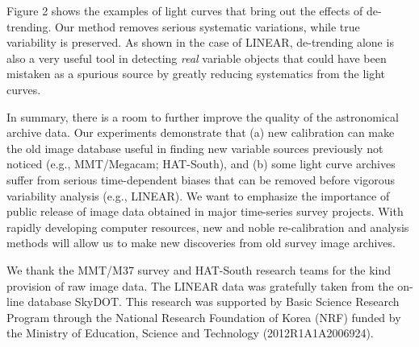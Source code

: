 \noindent Figure 2 shows the examples of light curves that bring out the effects of de-trending.  Our method removes serious systematic variations, while true variability is preserved.  As shown in the case of LINEAR, de-trending alone is also a very useful tool in detecting {\itshape real} variable objects that could have been mistaken as a spurious source by greatly reducing systematics from the light curves.

In summary, there is a room to further improve the quality of the astronomical archive data.  Our experiments demonstrate that (a) new calibration can make the old image database useful in finding new variable sources previously not noticed (e.g., MMT/Megacam; HAT-South), and (b) some light curve archives suffer from serious time-dependent biases that can be removed before vigorous variability analysis (e.g., LINEAR).  We want to emphasize the importance of public release of image data obtained in major time-series survey projects.  With rapidly developing computer resources, new and noble re-calibration and analysis methods will allow us to make new discoveries from old survey image archives.  

\acknowledgements We thank the MMT/M37 survey and HAT-South research teams for the kind provision of raw image data.  The LINEAR data was gratefully taken from the on-line database SkyDOT.  This research was supported by Basic Science Research Program through the National Research Foundation of Korea (NRF) funded by the Ministry of Education, Science and Technology (2012R1A1A2006924).


